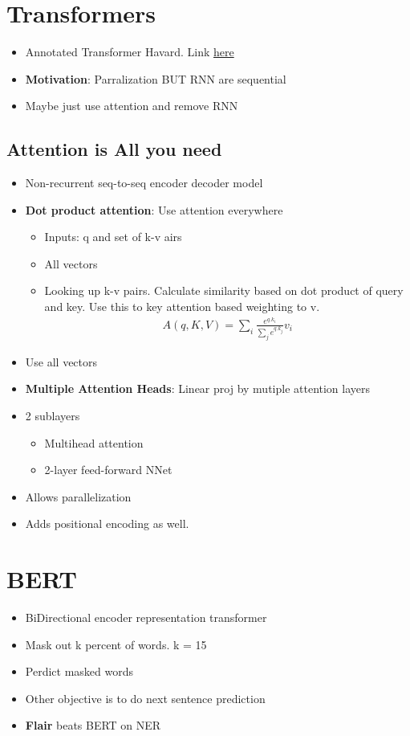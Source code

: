 \documentclass[a4paper]{article}
\begin{document}
\section{Transformers}
\begin{itemize}
    \item Annotated Transformer Havard. Link \href{https://nlp.seas.harvard.edu/2018/04/03/attention.html}{here}
    \item \textbf{Motivation}: Parralization BUT RNN are sequential 
    \item Maybe just use attention and remove RNN
\end{itemize}
\subsection{Attention is All you need}
\begin{itemize}
    \item Non-recurrent seq-to-seq encoder decoder model
    \item \textbf{Dot product attention}: Use attention everywhere 
        \begin{itemize}
            \item Inputs: q and set of k-v airs
            \item All vectors
            \item Looking up k-v pairs. Calculate similarity based on dot product of query and key. Use this to key attention based weighting to v.
                \begin{equation}
                    \begin{split}
                        A(q,K,V) = \sum_{i} \frac{e^{q.k_i}}{\sum_{j} e^{q.k_j}}v_i
                    \end{split}
                \end{equation}
        \end{itemize}
    \item Use all vectors
    \item \textbf{Multiple Attention Heads}: Linear proj by mutiple attention layers
    \item 2 sublayers
    \begin{itemize}
        \item Multihead attention
        \item 2-layer feed-forward NNet
    \end{itemize}
    \item Allows parallelization
    \item Adds positional encoding as well.
\end{itemize}
\section{BERT}
\begin{itemize}
    \item BiDirectional encoder representation transformer
    \item Mask out k percent of words. k = 15
    \item Perdict masked words
    \item Other objective is to do next sentence prediction
    \item \textbf{Flair} beats BERT on NER
\end{itemize}
\end{document}
